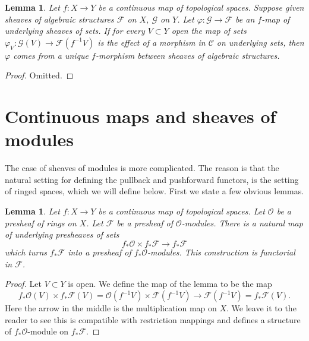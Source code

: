 \documentclass{stacks-project}
\theoremstyle{plain}
\newtheorem{lemma}[subsection]{Lemma}
\theoremstyle{definition}
\theoremstyle{remark}
\numberwithin{equation}{subsection}
\begin{document}
\begin{lemma}
\label{lemma-f-map-sets-algebraic-structures}
Let $f : X \to Y$ be a continuous map of topological spaces.
Suppose given sheaves of algebraic structures
$\mathcal{F}$ on $X$, $\mathcal{G}$ on $Y$. Let
$\varphi : \mathcal{G} \to \mathcal{F}$ be an $f$-map
of underlying sheaves of sets. If for every $V \subset Y$ open the
map of sets $\varphi_V : \mathcal{G}(V) \to \mathcal{F}(f^{-1}V)$
is the effect of a morphism in $\mathcal{C}$ on underlying sets,
then $\varphi$ comes from a unique $f$-morphism between
sheaves of algebraic structures.
\end{lemma}

\begin{proof}
Omitted.
\end{proof}




\section{Continuous maps and sheaves of modules}
\label{section-presheaves-modules-functorial}

\noindent
The case of sheaves of modules is more complicated.
The reason is that the natural setting for defining
the pullback and pushforward functors, is the setting
of ringed spaces, which we will define below. First
we state a few obvious lemmas.

\begin{lemma}
\label{lemma-pushforward-presheaf-module}
Let $f : X \to Y$ be a continuous map of topological spaces.
Let $\mathcal{O}$ be a presheaf of rings on $X$. Let
$\mathcal{F}$ be a presheaf of $\mathcal{O}$-modules.
There is a natural map of underlying presheaves of sets
$$
f_*\mathcal{O} \times f_*\mathcal{F}
\longrightarrow
f_*\mathcal{F}
$$
which turns $f_*\mathcal{F}$ into a presheaf of
$f_*\mathcal{O}$-modules. This construction is
functorial in $\mathcal{F}$.
\end{lemma}

\begin{proof}
Let $V \subset Y$ is open. We define the map of the lemma
to be the map
$$
f_*\mathcal{O}(V) \times f_*\mathcal{F}(V)
=
\mathcal{O}(f^{-1}V) \times \mathcal{F}(f^{-1}V)
\to
\mathcal{F}(f^{-1}V)
=
f_*\mathcal{F}(V).
$$
Here the arrow in the middle is the multiplication map on $X$.
We leave it to the reader to see this is compatible with
restriction mappings and defines a structure of
$f_*\mathcal{O}$-module on $f_*\mathcal{F}$.
\end{proof}
\end{document}
